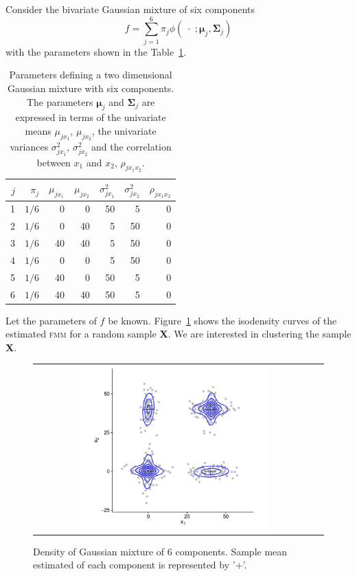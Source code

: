 \documentclass[submit]{smj}
\theoremstyle{definition}
\newcommand{\m}[1]{\boldsymbol{#1}}
\newcommand{\fmm}{\textsc{fmm}\xspace}
\begin{document}
Consider the bivariate Gaussian mixture of six components \citep{baudry2010combining}
\[
f= \sum_{j=1}^6 \pi_j \phi(\;\cdot\; ;  \m\mu_j, \m\Sigma_j)
\]
with the parameters shown in the Table~\ref{pars_table}. 

\begin{table}[htpb]
\centering
\begin{tabular}{rrrrrrr}
  \hline
$j$ & $\pi_j$ & $\mu_{j x_1}$ & $\mu_{j x_2}$ & $\sigma^2_{j x_1}$ & $\sigma^2_{j x_2}$ & $\rho_{j x_1 x_2}$ \\ 
  \hline
  1 &  $1/6$ &     0 &     0 &    50 &     5 &     0 \\ 
  2 &  $1/6$  &     0 &    40 &     5 &    50 &     0 \\ 
  3 &  $1/6$  &    40 &    40 &     5 &    50 &     0 \\ 
  4 &  $1/6$  &     0 &     0 &     5 &    50 &     0 \\ 
  5 &  $1/6$  &    40 &     0 &    50 &     5 &     0 \\ 
  6 &  $1/6$  &    40 &    40 &    50 &     5 &     0 \\ 
   \hline
\end{tabular}
\caption{Parameters defining a two dimensional Gaussian mixture with six components. The parameters $\m\mu_j$ and $\m\Sigma_j$ are expressed in terms of the univariate means $\mu_{j x_1}$, $\mu_{j x_2}$, the univariate variances $\sigma^2_{j x_1}$, $\sigma^2_{j x_2}$ and the correlation between $x_1$ and $x_2$, $\rho_{j x_1 x_2}$.}
\label{pars_table}
\end{table}


Let the parameters of $f$ be known. Figure~\ref{ex_mixture} shows the isodensity curves of the estimated \fmm for 
a random sample \textbf{X}. We are interested in clustering the sample \textbf{X}.

\begin{figure}[htbp]
\begin{center}
\begin{tabular}{cc}
  \includegraphics[width=0.7\textwidth]{figures/partition-example-mixture.pdf} \\
 \end{tabular}
 \caption{Density of Gaussian mixture of 6 components. Sample mean estimated of each component is represented by '+'.}\label{ex_mixture}
\end{center}
\end{figure}
\end{document}
